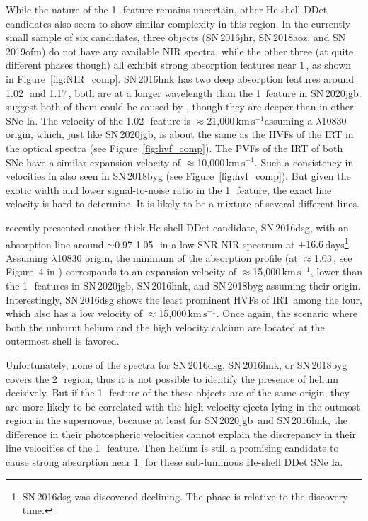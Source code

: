\documentclass[twocolumn]{aastex631}
\newcommand{\sn}{SN\,2020jgb}
\newcommand{\kms}{$\mathrm{km}\,\mathrm{s}^{-1}$}
\begin{document}
While the nature of the 1\,\micron\ feature remains uncertain, other He-shell DDet candidates also seem to show similar complexity in this region. In the currently small sample of six candidates, three objects (SN\,2016jhr, SN\,2018aoz, and SN\,2019ofm) do not have any available NIR spectra, while the other three (at quite different phases though) all exhibit strong absorption features near 1\,\micron, as shown in Figure~\ref{fig:NIR_comp}. SN\,2016hnk has two deep absorption features around 1.02\,\micron\ and 1.17\,\micron, both are at a longer wavelength than the 1\micron\ feature in \sn. \citet{galbany_16hnk_2019} suggest both of them could be caused by , though they are deeper than in other SNe Ia. The velocity of the 1.02\,\micron\ feature is $\approx$21,000\,\kms assuming a  $\lambda$10830 origin, which, just like \sn, is about the same as the HVFs of the  IRT in the optical spectra (see Figure~\ref{fig:hvf_comp}). The PVFs of the  IRT of both SNe have a similar expansion velocity of $\approx$10,000\,\kms. Such a consistency in velocities in also seen in SN\,2018byg (see Figure~\ref{fig:hvf_comp}). But given the exotic width and lower signal-to-noise ratio in the 1\,\micron\ feature, the exact line velocity is hard to determine. It is likely to be a mixture of several different lines. 

\citet{Dong_16dsg_2022} recently presented another thick He-shell DDet candidate, SN\,2016dsg, with an absorption line around $\sim$0.97-1.05\,\micron\ in a low-SNR NIR spectrum at $+16.6$\,days\footnote{SN\,2016dsg was discovered declining. The phase is relative to the discovery time.}. Assuming  $\lambda$10830 origin, the minimum of the absorption profile (at $\approx$1.03\,\micron, see Figure~4 in \citealp{Dong_16dsg_2022}) corresponds to an expansion velocity of $\approx$15,000\,\kms, lower than the 1\,\micron\ features in \sn, SN\,2016hnk, and SN\,2018byg assuming their  origin. Interestingly, SN\,2016dsg shows the least prominent HVFs of  IRT among the four, which also has a low velocity of $\approx$15,000\,\kms. Once again, the scenario where both the unburnt helium and the high velocity calcium are located at the outermost shell is favored.

Unfortunately, none of the spectra for SN\,2016dsg, SN\,2016hnk, or SN\,2018byg covers the 2\,\micron\ region, thus it is not possible to identify the presence of helium decisively. But if the 1\,\micron\ feature of the these objects are of the same origin, they are more likely to be correlated with the high velocity ejecta lying in the outmost region in the supernovae, because at least for \sn\ and SN\,2016hnk, the difference in their photospheric velocities cannot explain the discrepancy in their line velocities of the 1\,\micron\ feature. Then helium is still a promising candidate to cause strong absorption near 1\,\micron\ for these sub-luminous He-shell DDet SNe Ia. 
\end{document}
